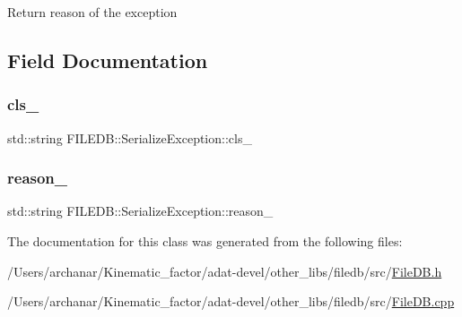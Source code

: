 Return reason of the exception 

\subsection{Field Documentation}
\mbox{\label{classFILEDB_1_1SerializeException_ad82d67694aa41ca34cf81226c07f2b42}} 
\subsubsection{\texorpdfstring{cls\_}{cls\_}}
{\footnotesize\ttfamily std\+::string F\+I\+L\+E\+D\+B\+::\+Serialize\+Exception\+::cls\+\_\+\hspace{0.3cm}{\ttfamily [protected]}}

\mbox{\label{classFILEDB_1_1SerializeException_aa9e4b477e71cc170bda3a4ff2a4822de}} 
\subsubsection{\texorpdfstring{reason\_}{reason\_}}
{\footnotesize\ttfamily std\+::string F\+I\+L\+E\+D\+B\+::\+Serialize\+Exception\+::reason\+\_\+\hspace{0.3cm}{\ttfamily [protected]}}



The documentation for this class was generated from the following files\+:\begin{DoxyCompactItemize}
\item 
/\+Users/archanar/\+Kinematic\+\_\+factor/adat-\/devel/other\+\_\+libs/filedb/src/\mbox{\hyperlink{adat-devel_2other__libs_2filedb_2src_2FileDB_8h}{File\+D\+B.\+h}}\item 
/\+Users/archanar/\+Kinematic\+\_\+factor/adat-\/devel/other\+\_\+libs/filedb/src/\mbox{\hyperlink{adat-devel_2other__libs_2filedb_2src_2FileDB_8cpp}{File\+D\+B.\+cpp}}\end{DoxyCompactItemize}
